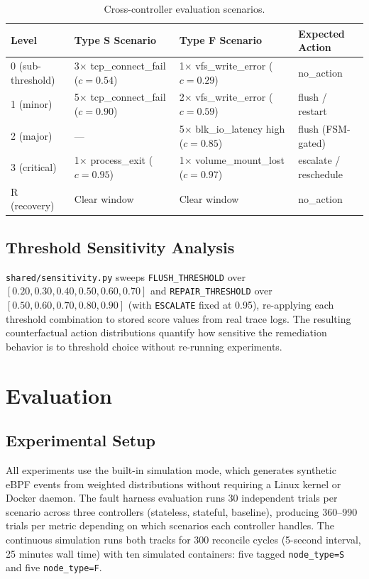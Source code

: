 \documentclass[runningheads]{llncs}
\begin{document}
\begin{table}[t]
\centering
\caption{Cross-controller evaluation scenarios.}
\label{tab:scenarios}
\begin{tabular}{llll}
\toprule
\textbf{Level} & \textbf{Type S Scenario} & \textbf{Type F Scenario}
  & \textbf{Expected Action} \\
\midrule
0 (sub-threshold)
  & 3$\times$ tcp\_connect\_fail ($c{=}0.54$)
  & 1$\times$ vfs\_write\_error ($c{=}0.29$)
  & no\_action \\
1 (minor)
  & 5$\times$ tcp\_connect\_fail ($c{=}0.90$)
  & 2$\times$ vfs\_write\_error ($c{=}0.59$)
  & flush / restart \\
2 (major)
  & ---
  & 5$\times$ blk\_io\_latency high ($c{=}0.85$)
  & flush (FSM-gated) \\
3 (critical)
  & 1$\times$ process\_exit ($c{=}0.95$)
  & 1$\times$ volume\_mount\_lost ($c{=}0.97$)
  & escalate / reschedule \\
R (recovery)
  & Clear window
  & Clear window
  & no\_action \\
\bottomrule
\end{tabular}
\end{table}

\subsection{Threshold Sensitivity Analysis}

\texttt{shared/sensitivity.py} sweeps \texttt{FLUSH\_THRESHOLD} over
$[0.20, 0.30, 0.40, 0.50, 0.60, 0.70]$ and \texttt{REPAIR\_THRESHOLD}
over $[0.50, 0.60, 0.70, 0.80, 0.90]$ (with \texttt{ESCALATE} fixed
at 0.95), re-applying each threshold combination to stored score
values from real trace logs.  The resulting counterfactual action
distributions quantify how sensitive the remediation behavior is to
threshold choice without re-running experiments.

\section{Evaluation}
\label{sec:evaluation}

\subsection{Experimental Setup}

All experiments use the built-in simulation mode, which generates
synthetic eBPF events from weighted distributions without requiring
a Linux kernel or Docker daemon.  The fault harness evaluation runs
30 independent trials per scenario across three controllers (stateless,
stateful, baseline), producing 360--990 trials per metric depending
on which scenarios each controller handles.  The continuous simulation
runs both tracks for 300 reconcile cycles (5-second interval,
25 minutes wall time) with ten simulated containers: five tagged
\texttt{node\_type=S} and five \texttt{node\_type=F}.
\end{document}
